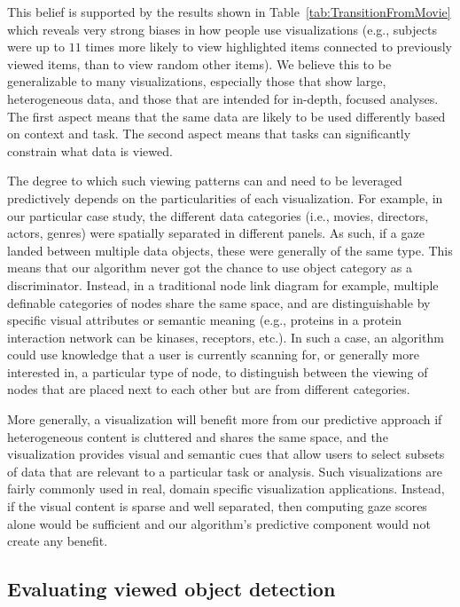 This belief is supported by the results shown in Table~\ref{tab:TransitionFromMovie} which reveals very strong biases in how people use visualizations (e.g., subjects were up to $11$ times more likely to view highlighted items connected to previously viewed items, than to view random other items). We believe this to be generalizable to many visualizations, especially those that show large, heterogeneous data, and those that are intended for in-depth, focused analyses. The first aspect means that the same data are likely to be used differently based on context and task. The second aspect means that  tasks can significantly constrain what data is viewed.     

The degree to which such viewing patterns can and need to be leveraged predictively depends on the particularities of each visualization. For example, in our particular case study, the different data categories (i.e., movies, directors, actors, genres) were spatially separated in different panels. As such, if a gaze landed between multiple data objects, these were generally of the same type. This means that our algorithm never got the chance to use object category as a discriminator. Instead, in a traditional node link diagram for example, multiple definable categories of nodes share the same space, and are distinguishable by specific visual attributes or semantic meaning (e.g., proteins in a protein interaction network can be kinases, receptors, etc.). In such a case, an algorithm could use knowledge that a user is currently scanning for, or generally more interested in, a particular type of node, to distinguish between the viewing of nodes that are placed next to each other but are from different categories.  

More generally, a visualization will benefit more from our predictive approach if heterogeneous content is cluttered and shares the same space, and the visualization provides visual and semantic cues that allow users to select subsets of  data that are relevant to a particular task or analysis. Such visualizations are fairly commonly used in real, domain specific visualization applications. Instead, if the visual content is sparse and well separated, then computing gaze scores alone would be sufficient and our algorithm's predictive component would not create any benefit.



\subsection{Evaluating viewed object detection} 
\label{sec:DiscussionEvaluatingViewedObjectDetection}


